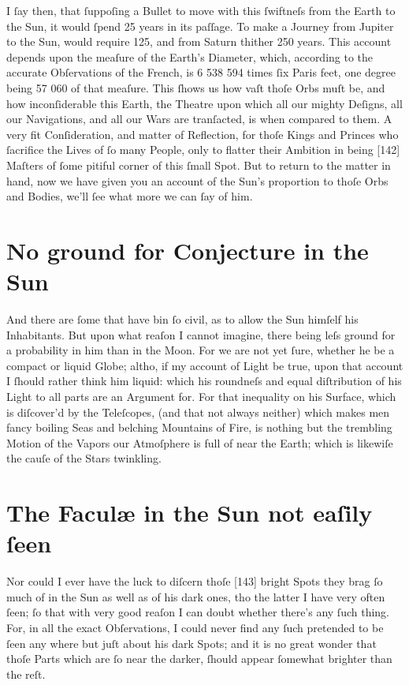 \documentclass[letterpaper]{book}
\begin{document}
I ſay then, that ſuppoſing a Bullet to move with this ſwiftneſs from the
Earth to the Sun, it would ſpend 25 years in its paſſage. To make a Journey
from Jupiter to the Sun, would require 125, and from Saturn thither 250
years. This account depends upon the meaſure of the Earth's Diameter,
which, according to the accurate Obſervations of the French, is 6 538 594
times ſix Paris feet, one degree being 57 060 of that meaſure. This ſhows
us how vaſt thoſe Orbs muſt be, and how inconſiderable this Earth, the
Theatre upon which all our mighty Deſigns, all our Navigations, and all our
Wars are tranſacted, is when compared to them. A very fit Conſideration,
and matter of Reflection, for thoſe Kings and Princes who ſacrifice the Lives
of ſo many People, only to flatter their Ambition in being [142] Maſters of
ſome pitiful corner of this ſmall Spot. But to return to the matter in hand,
now we have given you an account of the Sun's proportion to thoſe Orbs
and Bodies, we'll ſee what more we can ſay of him.


\section{No ground for Conjecture in the Sun}

And there are ſome that have bin ſo civil, as to allow the Sun himſelf his
Inhabitants. But upon what reaſon I cannot imagine, there being leſs
ground for a probability in him than in the Moon. For we are not yet ſure,
whether he be a compact or liquid Globe; altho, if my account of Light be
true, upon that account I ſhould rather think him liquid: which his
roundneſs and equal diſtribution of his Light to all parts are an Argument
for. For that inequality on his Surface, which is diſcover'd by the
Teleſcopes, (and that not always neither) which makes men fancy boiling Seas
and belching Mountains of Fire, is nothing but the trembling Motion of the
Vapors our Atmoſphere is full of near the Earth; which is likewiſe the cauſe
of the Stars twinkling.


\section{The Faculæ in the Sun not eaſily ſeen}

Nor could I ever have the luck to diſcern thoſe [143] bright Spots they brag
ſo much of in the Sun as well as of his dark ones, tho the latter I have very
often ſeen; ſo that with very good reaſon I can doubt whether there's any
ſuch thing. For, in all the exact Obſervations, I could never find any ſuch
pretended to be ſeen any where but juſt about his dark Spots; and it is no
great wonder that thoſe Parts which are ſo near the darker, ſhould appear
ſomewhat brighter than the reſt.
\end{document}
